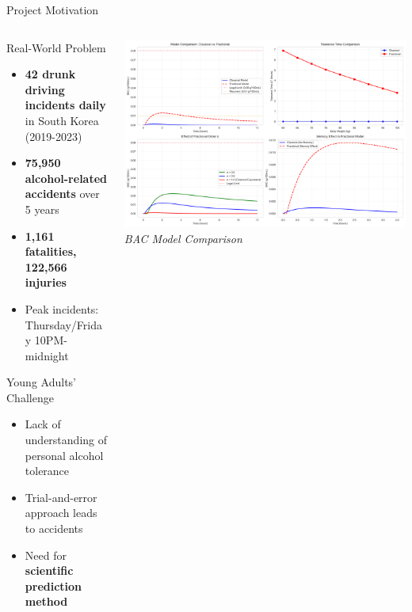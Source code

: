 \documentclass[aspectratio=169]{beamer}
\newcommand{\highlight}[1]{\textcolor{kentech_orange}{\textbf{#1}}}
\newcommand{\warning}[1]{\textcolor{warning_red}{\textbf{#1}}}
\begin{document}
\begin{frame}{Project Motivation}
    \begin{columns}
        \begin{column}{0.6\textwidth}
            \begin{block}{Real-World Problem}
                \begin{itemize}
                    \item \warning{42 drunk driving incidents daily} in South Korea (2019-2023)
                    \item \warning{75,950 alcohol-related accidents} over 5 years
                    \item \warning{1,161 fatalities, 122,566 injuries}
                    \item Peak incidents: Thursday/Friday 10PM-midnight
                \end{itemize}
            \end{block}
            
            \begin{block}{Young Adults' Challenge}
                \begin{itemize}
                    \item Lack of understanding of personal alcohol tolerance
                    \item Trial-and-error approach leads to accidents
                    \item Need for \highlight{scientific prediction method}
                \end{itemize}
            \end{block}
        \end{column}
        
        \begin{column}{0.4\textwidth}
            \begin{center}
                \includegraphics[width=\textwidth]{model_analysis.png}
                \small{\textit{BAC Model Comparison}}
            \end{center}
        \end{column}
    \end{columns}
\end{frame}
\end{document}
